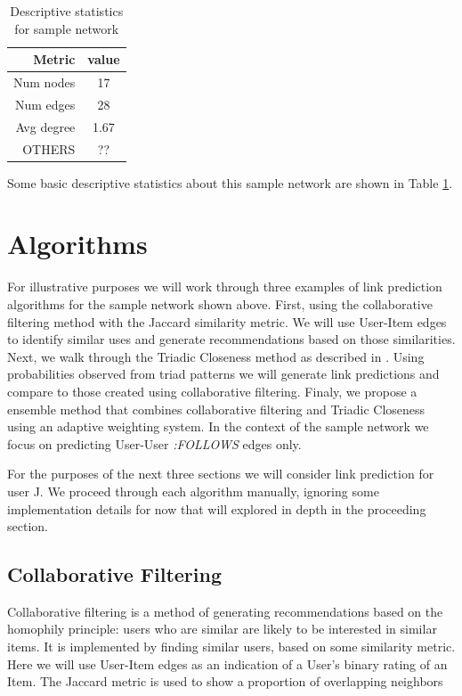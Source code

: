 \begin{table}[t]
\caption{Descriptive statistics for sample network}
\label{sample_network_stats}
\vskip 0.15in
\begin{center}
\begin{small}
\begin{sc}
\begin{tabular}{rc}
\hline
Metric & value\\
\hline
Num nodes & 17\\
Num edges & 28\\
Avg degree & 1.67\\
OTHERS & ??\\
\hline
\end{tabular}
\end{sc}
\end{small}
\end{center}
\vskip -0.1in
\end{table}

Some basic descriptive statistics about this sample network are shown in Table \ref{sample_network_stats}. 

\section{Algorithms}

For illustrative purposes we will work through three examples of link prediction algorithms for the sample network shown above. First, using the collaborative filtering method with the Jaccard similarity metric. We will use User-Item edges to identify similar uses and generate recommendations based on those similarities. Next, we walk through the Triadic Closeness method as described in \cite{Schall2014}. Using probabilities observed from triad patterns we will generate link predictions and compare to those created using collaborative filtering. Finaly, we propose a ensemble method that combines collaborative filtering and Triadic Closeness using an adaptive weighting system. In the context of the sample network we focus on predicting User-User \textit{:FOLLOWS} edges only.

For the purposes of the next three sections we will consider link prediction for user J. We proceed through each algorithm manually, ignoring some implementation details for now that will explored in depth in the proceeding section.

\subsection{Collaborative Filtering}
Collaborative filtering is a method of generating recommendations based on the homophily principle: users who are similar are likely to be interested in similar items. It is implemented by finding similar users, based on some similarity metric. \cite{cf} Here we will use User-Item edges as an indication of a User's binary rating of an Item. The Jaccard metric is used to show a proportion of overlapping neighbors

